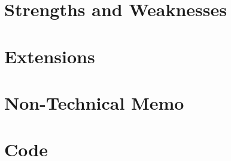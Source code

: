 \documentclass[notitlepage, 12pt]{article}
\begin{document}
\section{Strengths and Weaknesses}

\section{Extensions}

\section{Non-Technical Memo}

\appendix
\section{Code}







\end{document}
